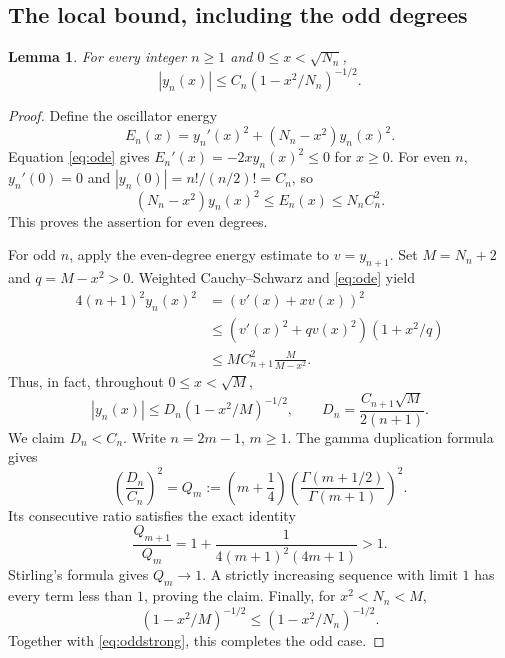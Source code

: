 \documentclass[11pt]{article}
\newtheorem{lemma}{Lemma}
\begin{document}
\subsection*{The local bound, including the odd degrees}
\begin{lemma}\label{lem:local}
For every integer $n\ge1$ and $0\le x<\sqrt{N_n}$,
\[
 |y_n(x)|\le C_n(1-x^2/N_n)^{-1/2}.
\]
\end{lemma}
\begin{proof}
Define the oscillator energy
\[
 E_n(x)=y_n'(x)^2+(N_n-x^2)y_n(x)^2.
\]
Equation \eqref{eq:ode} gives $E_n'(x)=-2xy_n(x)^2\le0$ for $x\ge0$.
For even $n$, $y_n'(0)=0$ and
$|y_n(0)|=n!/(n/2)!=C_n$, so
\[
 (N_n-x^2)y_n(x)^2\le E_n(x)\le N_n C_n^2.
\]
This proves the assertion for even degrees.

For odd $n$, apply the even-degree energy estimate to $v=y_{n+1}$.
Set $M=N_n+2$ and $q=M-x^2>0$. Weighted Cauchy--Schwarz and
\eqref{eq:ode} yield
\begin{align*}
 4(n+1)^2y_n(x)^2
   &=(v'(x)+xv(x))^2\\
   &\le (v'(x)^2+qv(x)^2)(1+x^2/q)\\
   &\le M C_{n+1}^2\frac{M}{M-x^2}.
\end{align*}
Thus, in fact, throughout $0\le x<\sqrt M$,
\begin{equation}\label{eq:oddstrong}
 |y_n(x)|\le D_n(1-x^2/M)^{-1/2},\qquad
 D_n=\frac{C_{n+1}\sqrt M}{2(n+1)}.
\end{equation}
We claim $D_n<C_n$. Write $n=2m-1$, $m\ge1$. The gamma duplication
formula gives
\[
 \left(\frac{D_n}{C_n}\right)^2
 =Q_m:=\left(m+\frac14\right)
       \left(\frac{\Gamma(m+1/2)}{\Gamma(m+1)}\right)^2.
\]
Its consecutive ratio satisfies the exact identity
\[
 \frac{Q_{m+1}}{Q_m}
 =1+\frac1{4(m+1)^2(4m+1)}>1.
\]
Stirling's formula gives $Q_m\longrightarrow1$. A strictly increasing
sequence with limit $1$ has every term less than $1$, proving the claim.
Finally, for $x^2<N_n<M$,
\[
 (1-x^2/M)^{-1/2}\le(1-x^2/N_n)^{-1/2}.
\]
Together with \eqref{eq:oddstrong}, this completes the odd case.
\end{proof}
\end{document}
